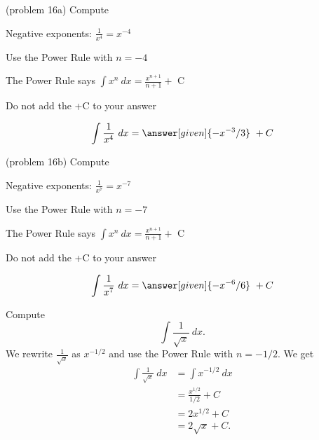 \documentclass{ximera}
\begin{document}
\begin{problem}(problem 16a)
Compute 

\begin{hint}
Negative exponents: $\frac{1}{x^4} = x^{-4}$
\end{hint}
\begin{hint}
Use the Power Rule with $n=-4$
\end{hint}
\begin{hint}
The Power Rule says $\int x^n \ dx = \frac{x^{n+1}}{n+1} +$ C
\end{hint}
\begin{hint}
\begin{center}
Do not add the +C to your answer
\end{center}
\end{hint}

\[
\int \frac{1}{x^4} \ dx =
\answer[given]{-x^{-3} /3} \ + C
\]
\end{problem}


\begin{problem}(problem 16b)
Compute 

\begin{hint}
Negative exponents: $\frac{1}{x^7} = x^{-7}$
\end{hint}
\begin{hint}
Use the Power Rule with $n=-7$
\end{hint}
\begin{hint}
The Power Rule says $\int x^n \ dx = \frac{x^{n+1}}{n+1} +$ C
\end{hint}
\begin{hint}
\begin{center}
Do not add the +C to your answer
\end{center}
\end{hint}

\[
\int \frac{1}{x^7} \ dx =
\answer[given]{-x^{-6} /6} \ + C
\]
\end{problem}



\begin{example}[example 17]
Compute $$\int \frac{1}{\sqrt x} \ dx.$$
We rewrite $\frac{1}{\sqrt x}$ as $x^{-1/2}$ and use the Power Rule 
with $n= -1/2$.
We get
\begin{align*}
\int \frac{1}{\sqrt x} \ dx &= \int x^{-1/2} \ dx \\
&= \frac{x^{1/2}}{1/2} + C \\ 
&=  2x^{1/2} + C \\
&= 2\sqrt x +C.
\end{align*} 

\end{example}
\end{document}
